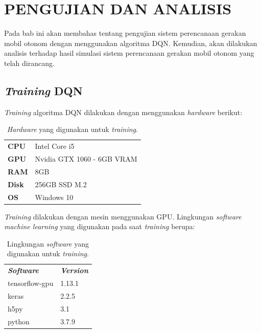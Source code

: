 \chapter{PENGUJIAN DAN ANALISIS}
\label{chap:pengujiananalisis}


Pada bab ini akan membahas tentang pengujian sistem perencanaan gerakan mobil otonom dengan menggunakan algoritma DQN. Kemudian, akan dilakukan analisis terhadap hasil simulasi sistem
perencanaan gerakan mobil otonom yang telah dirancang.

\section{\textit{Training }DQN}
\label{sec:training_dqn}
\textit{Training }algoritma DQN dilakukan dengan menggunakan \textit{hardware }berikut:
\begin{table}[H]
	\begin{tabular}{ll}
		\textbf{CPU}  & Intel Core i5              \\
		\textbf{GPU}  & Nvidia GTX 1060 - 6GB VRAM \\
		\textbf{RAM}  & 8GB                        \\
		\textbf{Disk} & 256GB SSD M.2              \\
		\textbf{OS}   & Windows 10                
	\end{tabular}
\caption{\textit{Hardware} yang digunakan untuk \textit{training}.}
\label{tb:hardwaresetup}
\end{table}

\textit{Training} dilakukan dengan mesin menggunakan GPU. Lingkungan \textit{software} \textit{machine learning} yang digunakan pada saat \textit{training }berupa:

\begin{table}[H]
	\begin{tabular}{ll}
		\textbf{\textit{Software}}  & \textbf{\textit{Version}}              \\
		tensorflow-gpu  & 1.13.1	\\
		keras  & 2.2.5					\\
		h5py & 3.1              \\
		python & 3.7.9              \\
	\end{tabular}
	\caption{Lingkungan \textit{software }yang digunakan untuk \textit{training}.}
	\label{tb:softwaresetup}
\end{table}


